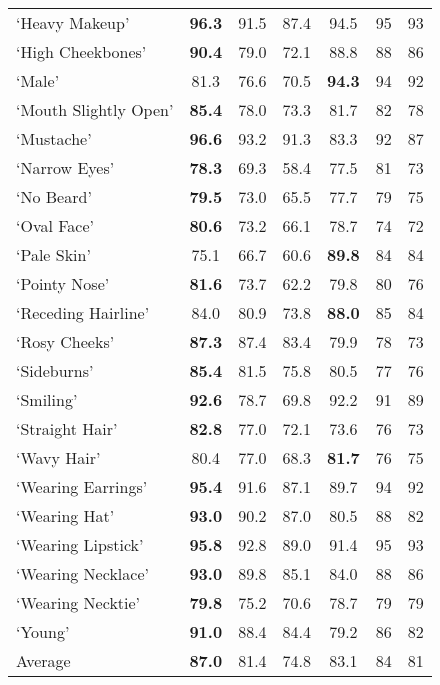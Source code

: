 \begin{table*}[htb]
\begin{center}
\begin{small}
\begin{sc}
\begin{tabular}{lcccccc}
‘Heavy Makeup’ & \bf96.3 & 91.5 & 87.4 & 94.5 & 95 & 93\\
‘High Cheekbones’ & \bf90.4 & 79.0 & 72.1 & 88.8 & 88 & 86\\
‘Male’ & 81.3 & 76.6 & 70.5 & \bf94.3 & 94 & 92\\
‘Mouth Slightly Open’ & \bf85.4 & 78.0 & 73.3 & 81.7 & 82 & 78 \\
‘Mustache’ & \bf96.6 & 93.2 & 91.3 & 83.3 & 92 & 87\\
‘Narrow Eyes’ & \bf78.3 & 69.3 & 58.4 & 77.5 & 81 & 73\\
‘No Beard’ & \bf79.5 & 73.0 & 65.5 & 77.7 & 79 & 75\\
‘Oval Face’ & \bf80.6 & 73.2 & 66.1 & 78.7 & 74 & 72\\
‘Pale Skin’ & 75.1 & 66.7 & 60.6 & \bf89.8 & 84 & 84\\
‘Pointy Nose'& \bf81.6 & 73.7 & 62.2 & 79.8 & 80 & 76\\
‘Receding Hairline’ & 84.0 & 80.9 & 73.8 & \bf88.0 & 85 & 84 \\
‘Rosy Cheeks’ & \bf87.3 & 87.4 & 83.4 & 79.9 & 78 & 73\\
‘Sideburns’ & \bf85.4 & 81.5 & 75.8 & 80.5 & 77 & 76\\
‘Smiling’ & \bf92.6 & 78.7 & 69.8 & 92.2 & 91 & 89\\
‘Straight Hair’ & \bf82.8 & 77.0 & 72.1 &  73.6 & 76 & 73\\
‘Wavy Hair’ & 80.4 & 77.0 & 68.3 & \bf81.7 & 76 & 75\\
‘Wearing Earrings’ & \bf95.4 & 91.6 & 87.1 & 89.7 & 94 & 92\\
‘Wearing Hat’ & \bf93.0 & 90.2 & 87.0 & 80.5 & 88 & 82\\
‘Wearing Lipstick’ & \bf95.8 & 92.8 & 89.0 & 91.4 & 95 & 93\\
‘Wearing Necklace’ & \bf93.0 & 89.8 & 85.1 & 84.0 & 88 & 86\\
‘Wearing Necktie’ & \bf79.8 & 75.2 & 70.6 & 78.7 & 79 & 79\\
‘Young’ & \bf91.0 & 88.4 & 84.4 & 79.2 & 86 & 82\\
\midrule
Average & \bf87.0 & 81.4 & 74.8 &  83.1 & 84 & 81\\
\bottomrule
\end{tabular}
\end{sc}
\end{small}
\end{center}
\vskip -0.25in
\end{table*}




